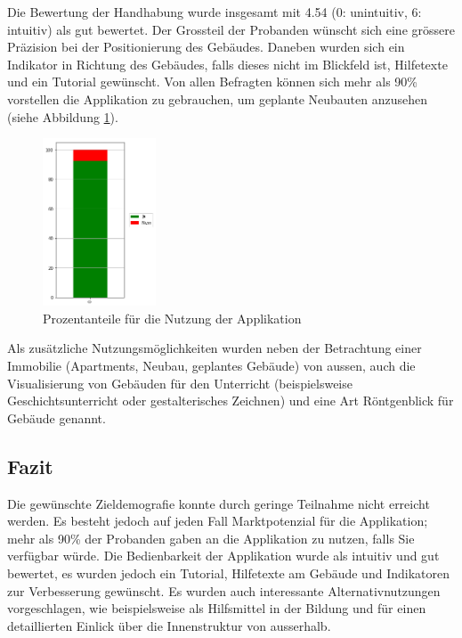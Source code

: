 \documentclass[a4paper]{scrreprt}
\begin{document}
Die Bewertung der Handhabung wurde insgesamt mit 4.54 (0: unintuitiv, 6: intuitiv) als gut bewertet. Der Grossteil der Probanden wünscht sich eine grössere Präzision bei der Positionierung des Gebäudes. Daneben wurden sich ein Indikator in Richtung des Gebäudes, falls dieses nicht im Blickfeld ist, Hilfetexte und ein Tutorial gewünscht. Von allen Befragten können sich mehr als 90\% vorstellen die Applikation zu gebrauchen, um geplante Neubauten anzusehen (siehe Abbildung \ref{fig:Nutzung}).

\begin{figure}[htb]
	\centering
	\includegraphics[keepaspectratio, width=0.3\textwidth]{Nutzung.png}
	\caption{Prozentanteile für die Nutzung der Applikation}
	\label{fig:Nutzung}
\end{figure}

Als zusätzliche Nutzungsmöglichkeiten wurden neben der Betrachtung einer Immobilie (Apartments, Neubau, geplantes Gebäude) von aussen, auch die Visualisierung von Gebäuden für den Unterricht (beispielsweise Geschichtsunterricht oder gestalterisches Zeichnen) und eine Art Röntgenblick für Gebäude genannt.

\subsection{Fazit}
Die gewünschte Zieldemografie konnte durch geringe Teilnahme nicht erreicht werden. Es besteht jedoch auf jeden Fall Marktpotenzial für die Applikation; mehr als 90\% der Probanden gaben an die Applikation zu nutzen, falls Sie verfügbar würde. Die Bedienbarkeit der Applikation wurde als intuitiv und gut bewertet, es wurden jedoch ein Tutorial, Hilfetexte am Gebäude und Indikatoren zur Verbesserung gewünscht. Es wurden auch interessante Alternativnutzungen vorgeschlagen, wie beispielsweise als Hilfsmittel in der Bildung und für einen detaillierten Einlick über die Innenstruktur von ausserhalb.
\end{document}
